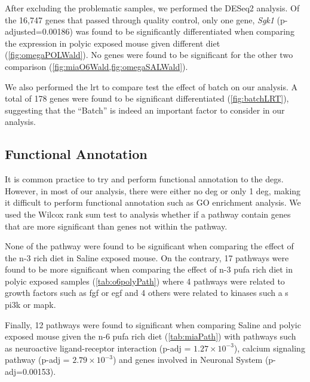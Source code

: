 After excluding the problematic samples, we performed the DESeq2 analysis.
Of the 16,747 genes that passed through quality control, only one gene, \textit{Sgk1} (p-adjusted=0.00186) was found to be significantly differentiated when comparing the expression in \gls{polyic} exposed mouse given different diet (\cref{fig:omegaPOLWald}).
No genes were found to be significant for the other two comparison (\cref{fig:miaO6Wald,fig:omegaSALWald}).


We also performed the \gls{lrt} to compare test the effect of batch on our analysis. 
A total of 178 genes were found to be significant differentiated (\cref{fig:batchLRT}), suggesting that the ``Batch'' is indeed an important factor to consider in our analysis.

\subsection{Functional Annotation}
It is common practice to try and perform functional annotation to the \glspl{deg}. 
However, in most of our analysis, there were either no \gls{deg} or only 1 \gls{deg}, making it difficult to perform functional annotation such as \gls{GO} enrichment analysis.
We used the Wilcox rank sum test to analysis whether if a pathway contain genes that are more significant than genes not within the pathway.

None of the pathway were found to be significant when comparing the effect of the n-3 rich diet in Saline exposed mouse. 
On the contrary, 17 pathways were found to be more significant when comparing the effect of n-3 \gls{pufa} rich diet in \gls{polyic} exposed samples (\cref{tab:o6polyPath}) where 4 pathways were related to growth factors such as \gls{fgf} or \gls{egf} and 4 others were related to kinases such a s \gls{pi3k} or \gls{mapk}.

Finally, 12 pathways were found to significant when comparing Saline and \gls{polyic} exposed mouse given the n-6 \gls{pufa} rich diet (\cref{tab:miaPath}) with pathways such as neuroactive ligand-receptor interaction (p-adj = $1.27\times10^{-3}$), calcium signaling pathway (p-adj = $2.79\times10^{-3}$) and genes involved in Neuronal System (p-adj=0.00153).


